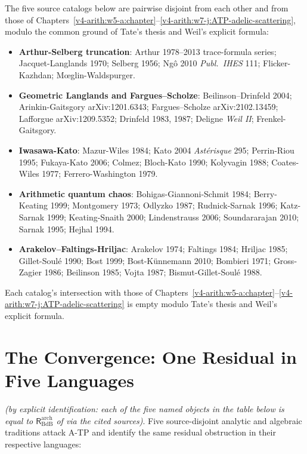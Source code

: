 The five source catalogs below are pairwise disjoint from each other
and from those of
Chapters~\ref{v4-arith:w5-a:chapter}--\ref{v4-arith:w7-j:ATP-adelic-scattering},
modulo the common ground of Tate's thesis and Weil's explicit formula:

\begin{itemize}
\item \textbf{Arthur-Selberg truncation}: Arthur 1978--2013 trace-formula
series; Jacquet-Langlands 1970; Selberg 1956;
Ng\^{o} 2010 \emph{Publ.~IHES} 111;
Flicker-Kazhdan; M\oe{}glin-Waldspurger.
\item \textbf{Geometric Langlands and Fargues--Scholze}:
Beilinson--Drinfeld 2004; Arinkin-Gaitsgory arXiv:1201.6343;
Fargues--Scholze arXiv:2102.13459; Lafforgue arXiv:1209.5352; Drinfeld
1983, 1987; Deligne \emph{Weil II}; Frenkel-Gaitsgory.
\item \textbf{Iwasawa-Kato}: Mazur-Wiles 1984; Kato 2004
\emph{Ast\'{e}risque} 295; Perrin-Riou 1995; Fukaya-Kato 2006; Colmez;
Bloch-Kato 1990; Kolyvagin 1988; Coates-Wiles 1977; Ferrero-Washington 1979.
\item \textbf{Arithmetic quantum chaos}: Bohigas-Giannoni-Schmit
1984; Berry-Keating 1999; Montgomery 1973; Odlyzko 1987; Rudnick-Sarnak
1996; Katz-Sarnak 1999; Keating-Snaith 2000; Lindenstrauss 2006;
Soundararajan 2010; Sarnak 1995; Hejhal 1994.
\item \textbf{Arakelov--Faltings-Hriljac}: Arakelov 1974;
Faltings 1984; Hriljac 1985; Gillet-Soul\'{e} 1990; Bost 1999;
Bost-K\"{u}nnemann 2010; Bombieri 1971; Gross-Zagier 1986; Beilinson 1985;
Vojta 1987; Bismut-Gillet-Soul\'{e} 1988.
\end{itemize}

Each catalog's intersection with those of
Chapters~\ref{v4-arith:w5-a:chapter}--\ref{v4-arith:w7-j:ATP-adelic-scattering}
is empty modulo Tate's thesis and Weil's explicit formula.

\section{The Convergence: One Residual in Five Languages}
\label{v4-arith:w8-atp:convergence}

\begin{theorem}
\label{v4-arith:w8-atp:thm:convergence}
\ClaimStatusProvedHere \emph{(by explicit identification: each of the
five named objects in the table below is equal to
\(\mathsf{R}^{\mathrm{arch}}_{\mathrm{BdB}}\) of
 via the cited
sources)}. Five source-disjoint analytic and algebraic traditions
attack A-TP and identify the same residual obstruction in their
respective languages:
\end{theorem}

